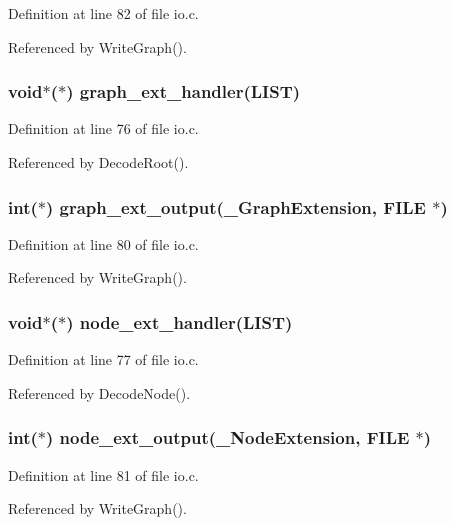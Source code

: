 Definition at line 82 of file io.c.

Referenced by Write\-Graph().
\subsubsection{\setlength{\rightskip}{0pt plus 5cm}void$\ast$($\ast$) \bf{graph\_\-ext\_\-handler}(\bf{LIST})}\label{io_8h_add6a8b1246a9f37cbf674f4c196ae5f}




Definition at line 76 of file io.c.

Referenced by Decode\-Root().
\subsubsection{\setlength{\rightskip}{0pt plus 5cm}int($\ast$) \bf{graph\_\-ext\_\-output}(\bf{\_\-Graph\-Extension}, FILE $\ast$)}\label{io_8h_fce54138ece8978a1b726ca48bba8642}




Definition at line 80 of file io.c.

Referenced by Write\-Graph().
\subsubsection{\setlength{\rightskip}{0pt plus 5cm}void$\ast$($\ast$) \bf{node\_\-ext\_\-handler}(\bf{LIST})}\label{io_8h_d53bb6c0407f9b5f8e69a417cc3f2239}




Definition at line 77 of file io.c.

Referenced by Decode\-Node().
\subsubsection{\setlength{\rightskip}{0pt plus 5cm}int($\ast$) \bf{node\_\-ext\_\-output}(\bf{\_\-Node\-Extension}, FILE $\ast$)}\label{io_8h_89440eecfb02ab36c60742760b9b9870}




Definition at line 81 of file io.c.

Referenced by Write\-Graph().